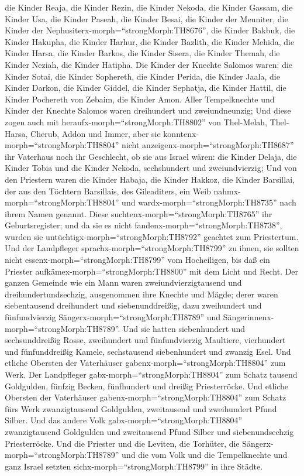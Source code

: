  die Kinder Reaja, die Kinder Rezin, die Kinder Nekoda,
 die Kinder Gassam, die Kinder Usa, die Kinder Paseah,
 die Kinder Besai, die Kinder der Meuniter, die Kinder der
Nephusiterx-morph=``strongMorph:TH8676'',  die Kinder
Bakbuk, die Kinder Hakupha, die Kinder Harhur,  die Kinder
Bazlith, die Kinder Mehida, die Kinder Harsa,  die Kinder
Barkos, die Kinder Sisera, die Kinder Themah,  die Kinder
Neziah, die Kinder Hatipha.  Die Kinder der Knechte Salomos
waren: die Kinder Sotai, die Kinder Sophereth, die Kinder Perida,
 die Kinder Jaala, die Kinder Darkon, die Kinder Giddel,
 die Kinder Sephatja, die Kinder Hattil, die Kinder
Pochereth von Zebaim, die Kinder Amon.  Aller Tempelknechte
und Kinder der Knechte Salomos waren dreihundert und zweiundneunzig;
 Und diese zogen auch mit
heraufx-morph=``strongMorph:TH8802'' von Thel-Melah, Thel-Harsa, Cherub,
Addon und Immer, aber sie konntenx-morph=``strongMorph:TH8804'' nicht
anzeigenx-morph=``strongMorph:TH8687'' ihr Vaterhaus noch ihr
Geschlecht, ob sie aus Israel wären:  die Kinder Delaja,
die Kinder Tobia und die Kinder Nekoda, sechshundert und zweiundvierzig;
 Und von den Priestern waren die Kinder Habaja, die Kinder
Hakkoz, die Kinder Barsillai, der aus den Töchtern Barsillais, des
Gileaditers, ein Weib nahmx-morph=``strongMorph:TH8804'' und
wardx-morph=``strongMorph:TH8735'' nach ihrem Namen genannt.
 Diese suchtenx-morph=``strongMorph:TH8765'' ihr
Geburtsregister; und da sie es nicht
fandenx-morph=``strongMorph:TH8738'', wurden sie
untüchtigx-morph=``strongMorph:TH8792'' geachtet zum Priestertum.
 Und der Landpfleger sprachx-morph=``strongMorph:TH8799''
zu ihnen, sie sollten nicht essenx-morph=``strongMorph:TH8799'' vom
Hocheiligen, bis daß ein Priester aufkämex-morph=``strongMorph:TH8800''
mit dem Licht und Recht.  Der ganzen Gemeinde wie ein Mann
waren zweiundvierzigtausend und dreihundertundsechzig, 
ausgenommen ihre Knechte und Mägde; derer waren siebentausend
dreihundert und siebenunddreißig, dazu zweihundert und fünfundvierzig
Sängerx-morph=``strongMorph:TH8789'' und
Sängerinnenx-morph=``strongMorph:TH8789''.  Und sie hatten
siebenhundert und sechsunddreißig Rosse, zweihundert und fünfundvierzig
Maultiere,  vierhundert und fünfunddreißig Kamele,
sechstausend siebenhundert und zwanzig Esel.  Und etliche
Obersten der Vaterhäuser gabenx-morph=``strongMorph:TH8804'' zum Werk.
Der Landpfleger gabx-morph=``strongMorph:TH8804'' zum Schatz tausend
Goldgulden, fünfzig Becken, fünfhundert und dreißig Priesterröcke.
 Und etliche Obersten der Vaterhäuser
gabenx-morph=``strongMorph:TH8804'' zum Schatz fürs Werk zwanzigtausend
Goldgulden, zweitausend und zweihundert Pfund Silber.  Und
das andere Volk gabx-morph=``strongMorph:TH8804'' zwanzigtausend
Goldgulden und zweitausend Pfund Silber und siebenundsechzig
Priesterröcke.  Und die Priester und die Leviten, die
Torhüter, die Sängerx-morph=``strongMorph:TH8789'' und die vom Volk und
die Tempelknechte und ganz Israel setzten
sichx-morph=``strongMorph:TH8799'' in ihre Städte.

